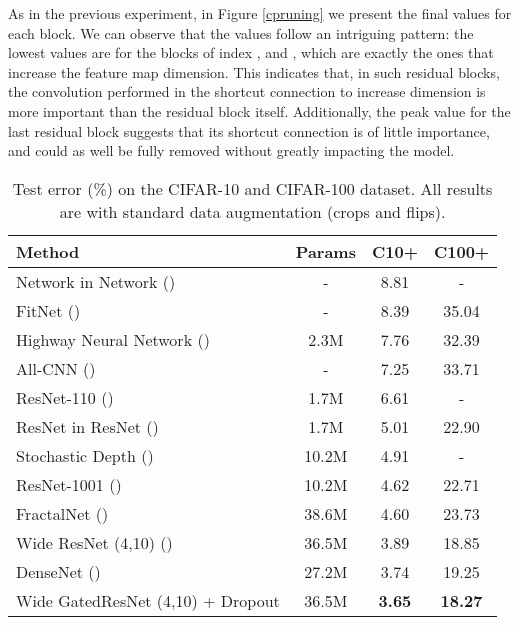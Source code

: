 \documentclass{article} \RequirePackage{amsmath,amsthm,amsfonts,amssymb}
\begin{document}
As in the previous experiment, in Figure \ref{cpruning} we present the final  values for each block. We can observe that the  values follow an intriguing pattern: the lowest values are for the blocks of index ,  and , which are exactly the ones that increase the feature map dimension. This indicates that, in such residual blocks, the convolution performed in the shortcut connection to increase dimension is more important than the residual block itself. Additionally, the peak value for the last residual block suggests that its shortcut connection is of little importance, and could as well be fully removed without greatly impacting the model.









\begin{table}[h!]
\centering
    \begin{tabular}{ | l | c | c | c |}
    \hline
    Method    			& 		  	Params & C10+  & C100+  \\ \hline

    Network in Network (\cite{nin})			& 			-  & 	8.81  &  - \\ 
    FitNet (\cite{fitnet})			& 			-  & 	8.39   & 	35.04\\ 
    Highway Neural Network (\cite{highway})			& 			2.3M  & 	7.76   & 	32.39 \\
    All-CNN (\cite{allcnn})			& 			-  & 	7.25  & 	33.71  \\
\hline
    ResNet-110 (\cite{resnet1})			& 			1.7M  & 	6.61  & 	- \\ 
    ResNet in ResNet (\cite{rir})			& 			1.7M  & 	5.01   & 	22.90 \\ 
    Stochastic Depth (\cite{stdepth})	& 			10.2M & 	4.91   & 	- \\ 
    ResNet-1001 (\cite{resnet2}) & 			10.2M & 	4.62   & 	22.71 \\ 
    FractalNet (\cite{fractal}) & 			38.6M & 	4.60     & 	23.73 \\ 
    Wide ResNet (4,10) (\cite{wide})	& 			36.5M & 	3.89  & 	18.85 \\ 
    DenseNet (\cite{densenet})	& 			27.2M & 	3.74      & 	19.25\\ 
    Wide GatedResNet (4,10) + Dropout	& 			36.5M 	& 	\textbf{3.65}  & 	\textbf{18.27} \\ \hline
    \end{tabular}
\caption{Test error (\%) on the CIFAR-10 and CIFAR-100 dataset. All results are with standard data augmentation (crops and flips).}
    \label{cifar_all}   
\end{table}
\end{document}
